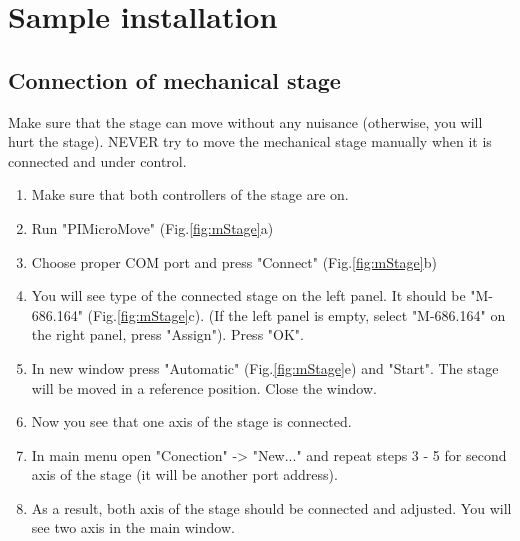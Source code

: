 \documentclass[14pt,a4paper] {article}
\begin{document}
\section{Sample installation}

\subsection{Connection of mechanical stage}

Make sure that the stage can move without any nuisance (otherwise, you will hurt the stage). NEVER try to move the mechanical stage manually when it is connected and under control.

\begin{enumerate}
\item Make sure that both controllers of the stage are on.
\item Run "PIMicroMove" (Fig.\ref{fig:mStage}a)
\item Choose proper COM port and press "Connect" (Fig.\ref{fig:mStage}b)
\item You will see type of the connected stage on the left panel. It should be "M-686.164" (Fig.\ref{fig:mStage}c). (If the left panel is empty, select "M-686.164" on the right panel, press "Assign"). Press "OK".
\item In new window press "Automatic" (Fig.\ref{fig:mStage}e) and  "Start". The stage will be moved in a reference position. Close the window.
\item Now you see that one axis of the stage is connected.
\item In main menu open "Conection" -> "New..." and repeat steps 3 - 5 for second axis of the stage (it will be another port address).
\item As a result, both axis of the stage should be connected and adjusted. You will see two axis in the main window.
\end{enumerate}
\end{document}
